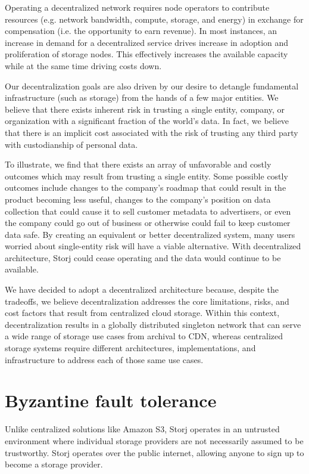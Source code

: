 \documentclass[11pt,fleqn,openany]{book}
\begin{document}
Operating a decentralized network requires node operators to contribute
resources (e.g. network bandwidth, compute, storage, and energy) in exchange
for compensation (i.e. the opportunity to earn revenue).
In most instances, an increase in demand for a decentralized service drives
increase in adoption and proliferation of storage nodes.
This effectively increases the available capacity while at the same time
driving costs down.

Our decentralization goals are also driven by our desire to detangle
fundamental infrastructure (such as storage) from the hands of a few major
entities.
We believe that there exists inherent risk in trusting a single entity,
company, or organization with a significant fraction of the world's data.
In fact, we believe that there is an implicit cost associated with the risk of
trusting any third party with custodianship of personal data.

To illustrate, we find that there exists an array of unfavorable
and costly outcomes which may result from trusting a single entity.
Some possible costly outcomes include changes to the company's roadmap that could result in the product
becoming less useful, changes to the company's position on data collection that could
cause it to sell customer metadata to advertisers, or even the company could go
out of business or otherwise could fail to keep customer data safe.
By creating an equivalent or better decentralized
system, many users worried about single-entity risk will have a viable
alternative.
With decentralized architecture, Storj could cease operating and the data
would continue to be available.

We have decided to adopt a decentralized architecture because, despite the tradeoffs, we believe decentralization addresses the core limitations,
risks, and cost factors that result from centralized cloud storage.
Within this context,
decentralization results in a globally distributed singleton network that can
serve a wide range of storage use cases from archival to CDN, whereas
centralized storage systems require different architectures, implementations,
and infrastructure to address each of those same use cases.

\section{Byzantine fault tolerance}

Unlike centralized solutions like Amazon S3, Storj operates in an untrusted
environment where individual storage providers are not necessarily assumed to be
trustworthy. Storj operates over the public internet, allowing anyone to sign
up to become a storage provider.
\end{document}
